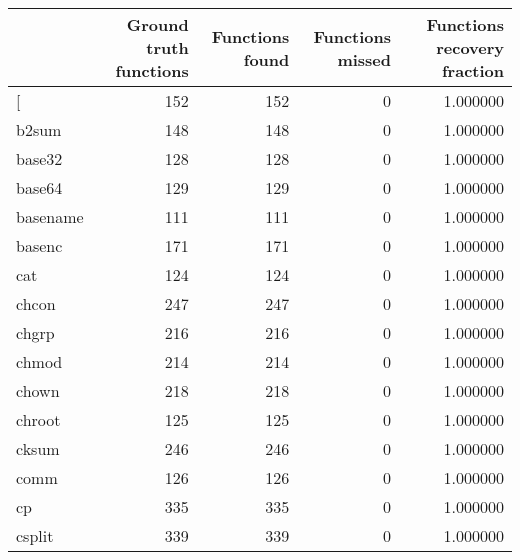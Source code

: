 \begin{tabular}{lrrrr}
\toprule
{} &  Ground truth functions &  Functions found &  Functions missed &  Functions recovery fraction \\
\midrule
[         &                     152 &              152 &                 0 &                     1.000000 \\
b2sum     &                     148 &              148 &                 0 &                     1.000000 \\
base32    &                     128 &              128 &                 0 &                     1.000000 \\
base64    &                     129 &              129 &                 0 &                     1.000000 \\
basename  &                     111 &              111 &                 0 &                     1.000000 \\
basenc    &                     171 &              171 &                 0 &                     1.000000 \\
cat       &                     124 &              124 &                 0 &                     1.000000 \\
chcon     &                     247 &              247 &                 0 &                     1.000000 \\
chgrp     &                     216 &              216 &                 0 &                     1.000000 \\
chmod     &                     214 &              214 &                 0 &                     1.000000 \\
chown     &                     218 &              218 &                 0 &                     1.000000 \\
chroot    &                     125 &              125 &                 0 &                     1.000000 \\
cksum     &                     246 &              246 &                 0 &                     1.000000 \\
comm      &                     126 &              126 &                 0 &                     1.000000 \\
cp        &                     335 &              335 &                 0 &                     1.000000 \\
csplit    &                     339 &              339 &                 0 &                     1.000000 \\

\end{tabular}
